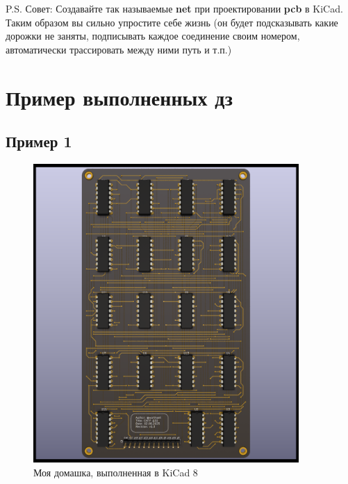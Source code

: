 \documentclass[a4paper, 12pt]{article}
\begin{document}
P.S. Совет: Создавайте так называемые \textbf{net} при проектировании \textbf{pcb} в KiCad. Таким образом вы сильно упростите себе жизнь (он будет подсказывать какие дорожки не заняты, подписывать каждое соединение своим номером, автоматически трассировать между ними путь и т.п.)

\section{Пример выполненных дз}

\subsection{Пример 1}
\begin{figure}[h!]
	\centering
	\includegraphics[width=0.9\textwidth]{docs/myhw3.png}
	\caption{Моя домашка, выполненная в KiCad 8}
\end{figure}
\end{document}
